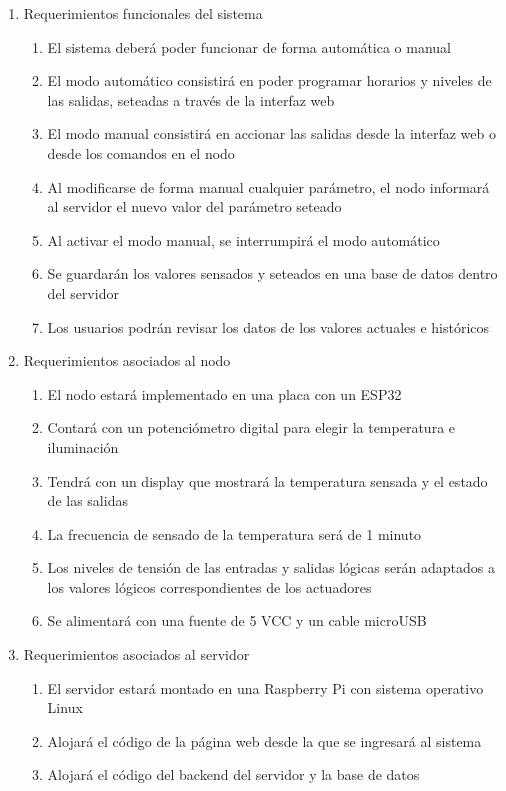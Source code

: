\documentclass[
11pt, %
]{charter}
\begin{document}
\begin{enumerate}
	\item Requerimientos funcionales del sistema
		\begin{enumerate}
			\item El sistema deberá poder funcionar de forma automática o manual
			\item El modo automático consistirá en poder programar horarios y niveles de las salidas, seteadas a través de la interfaz web
			\item El modo manual consistirá en accionar las salidas desde la interfaz web o desde los comandos en el nodo
			\item Al modificarse de forma manual cualquier parámetro, el nodo informará al servidor el nuevo valor del parámetro seteado
			\item Al activar el modo manual, se interrumpirá el modo automático
			\item Se guardarán los valores sensados y seteados en una base de datos dentro del servidor
			\item Los usuarios podrán revisar los datos de los valores actuales e históricos
		\end{enumerate}
	\item Requerimientos asociados al nodo
		\begin{enumerate}
			\item El nodo estará implementado en una placa con un ESP32
			\item Contará con un potenciómetro digital para elegir la temperatura e iluminación
			\item Tendrá con un display que mostrará la temperatura sensada y el estado de las salidas
			\item La frecuencia de sensado de la temperatura será de 1 minuto
			\item Los niveles de tensión de las entradas y salidas lógicas serán adaptados a los valores lógicos correspondientes de los actuadores
			\item Se alimentará con una fuente de 5 VCC y un cable microUSB
		\end{enumerate}
	\item Requerimientos asociados al servidor
		\begin{enumerate}
			\item El servidor estará montado en una Raspberry Pi con sistema operativo Linux
			\item Alojará el código de la página web desde la que se ingresará al sistema
			\item Alojará el código del backend del servidor y la base de datos

\end{enumerate}
\end{enumerate}
\end{document}

